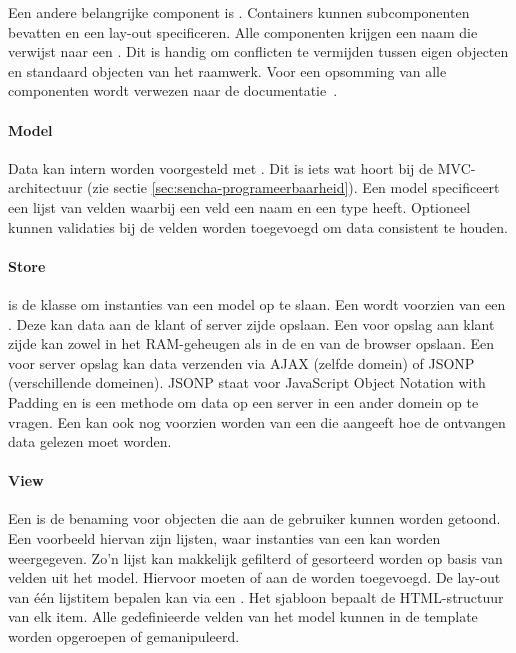 Een andere belangrijke component is .  
Containers kunnen subcomponenten bevatten en een lay-out specificeren.  
Alle componenten krijgen een naam die verwijst naar een .  
Dit is handig om conflicten te vermijden tussen eigen objecten en standaard objecten van het raamwerk.  
Voor een opsomming van alle componenten wordt verwezen naar de documentatie~\cite{Inc.2013a}.

\paragraph{Model}
Data kan intern worden voorgesteld met .  
Dit is iets wat hoort bij de MVC-architectuur (zie sectie \ref{sec:sencha-programeerbaarheid}).  
Een model specificeert een lijst van velden waarbij een veld een naam en een type heeft.  
Optioneel kunnen validaties bij de velden worden toegevoegd om data consistent te houden.  

\paragraph{Store}
 is de klasse om instanties van een model op te slaan.  
Een  wordt voorzien van een .  
Deze kan data aan de klant of server zijde opslaan.  
Een  voor opslag aan klant zijde kan zowel in het RAM-geheugen als in de  en  van de browser opslaan.  
Een  voor server opslag kan data verzenden via AJAX (zelfde domein) of JSONP (verschillende domeinen).  
JSONP staat voor JavaScript Object Notation with Padding en is een methode om data op een server in een ander domein op te vragen.
Een  kan ook nog voorzien worden van een  die aangeeft hoe de ontvangen data gelezen moet worden.

\paragraph{View}
Een  is de benaming voor objecten die aan de gebruiker kunnen worden getoond.  
Een voorbeeld hiervan zijn lijsten,  waar instanties van een  kan worden weergegeven.  
Zo'n lijst kan makkelijk gefilterd of gesorteerd worden op basis van velden uit het model.
Hiervoor moeten  of  aan de  worden toegevoegd. 
De lay-out van één lijstitem bepalen kan via een .  
Het sjabloon bepaalt de HTML-structuur van elk item.  
Alle gedefinieerde velden van het model kunnen in de template worden opgeroepen of gemanipuleerd.


